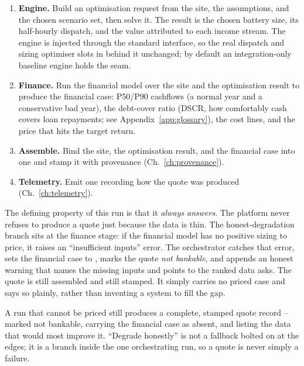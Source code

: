 \begin{enumerate}
  \item \textbf{Engine.} Build an optimisation request from the site, the assumptions, and the chosen scenario set, then solve it. The result is the chosen battery size, its half-hourly dispatch, and the value attributed to each income stream. The engine is injected through the standard interface, so the real dispatch and sizing optimiser slots in behind it unchanged; by default an integration-only baseline engine holds the seam.
  \item \textbf{Finance.} Run the financial model over the site and the optimisation result to produce the financial case: P50/P90 cashflows (a normal year and a conservative bad year), the debt-cover ratio (DSCR, how comfortably cash covers loan repayments; see Appendix~\ref{app:glossary}), the cost lines, and the price that hits the target return.
  \item \textbf{Assemble.} Bind the site, the optimisation result, and the financial case into one  and stamp it with provenance (Ch.~\ref{ch:provenance}).
  \item \textbf{Telemetry.} Emit one  recording how the quote was produced (Ch.~\ref{ch:telemetry}).
\end{enumerate}

The defining property of this run is that it \emph{always answers}. The platform never refuses to produce a quote just because the data is thin. The honest-degradation branch sits at the finance stage: if the financial model has no positive sizing to price, it raises an ``insufficient inputs'' error. The orchestrator catches that error, sets the financial case to , marks the quote \emph{not bankable}, and appends an honest warning that names the missing inputs and points to the ranked data asks. The quote is still assembled and still stamped. It simply carries no priced case and says so plainly, rather than inventing a system to fill the gap.

\begin{keyidea}
A run that cannot be priced still produces a complete, stamped quote record -- marked not bankable, carrying the financial case as absent, and listing the data that would most improve it. ``Degrade honestly'' is not a fallback bolted on at the edges; it is a branch inside the one orchestrating run, so a quote is never simply a failure.
\end{keyidea}

